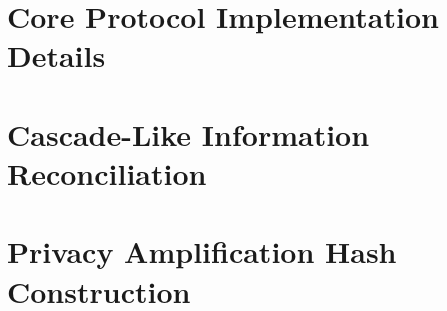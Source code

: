 \documentclass[conference]{IEEEtran}
\begin{document}



\ifCLASSOPTIONcaptionsoff
  \newpage
\fi


\appendices

\section{Core Protocol Implementation Details}
\label{app:protocol-details}

\section{Cascade-Like Information Reconciliation}
\label{app:cascade}

\section{Privacy Amplification Hash Construction}
\label{app:privacy-amplification}



\end{document}
